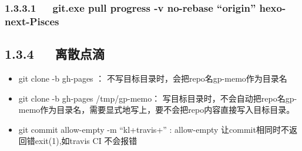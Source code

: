 \documentclass[letterpaper,12pt,english]{sphinxmanual}
\begin{document}
\subsubsection{1.3.3.1   git.exe pull \textendash{}progress -v \textendash{}no-rebase “origin” hexo-next-Pisces}
\label{\detokenize{001software/001install/001._u7f51_u7ad9/github:git-exe-pull-progress-v-no-rebase-origin-hexo-next-pisces}}
\begin{sphinxVerbatim}[commandchars=\\\{\}]
      

 
               
 \PYG{p}{[}  \PYG{p}{]}        
   

      
\end{sphinxVerbatim}


\subsection{1.3.4   离散点滴}
\label{\detokenize{001software/001install/001._u7f51_u7ad9/github:id7}}\begin{itemize}
\item {} 
git clone -b gh-pages ： 不写目标目录时，会把repo名gp-memo作为目录名

\item {} 
git clone -b gh-pages  /tmp/gp-memo： 写目标目录时，不会自动把repo名gp-memo作为目录名，需要显式地写上，要不会把repo内容直接写入目标目录。

\item {} 
git commit \textendash{}allow-empty -m “kl+travis+” : \textendash{}allow-empty 让commit相同时不返回错exit(1),如travis CI 不会报错

\end{itemize}
\end{document}
